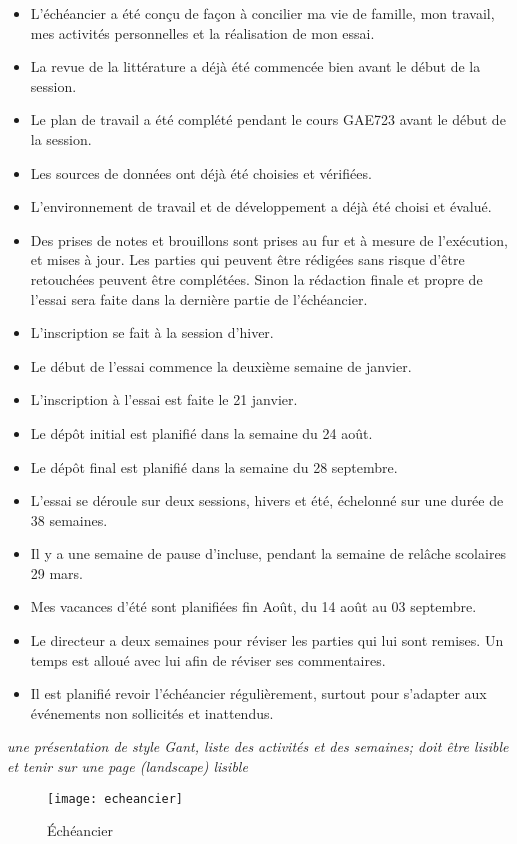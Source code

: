 \begin{itemize}
 \item L'échéancier a été conçu de façon à concilier ma vie de famille, mon travail, mes activités personnelles et la réalisation de mon essai.
 \item La revue de la littérature a déjà été commencée bien avant le début de la session.
 \item Le plan de travail a été complété pendant le cours GAE723 avant le début de la session.
 \item Les sources de données ont déjà été choisies et vérifiées.
 \item L'environnement de travail et de développement a déjà été choisi et évalué.
 \item Des prises de notes et brouillons sont prises au fur et à mesure de l'exécution, et mises à jour. Les parties qui peuvent être rédigées sans risque d'être retouchées peuvent être complétées. Sinon la rédaction finale et propre de l'essai sera faite dans la dernière partie de l'échéancier.
 \item L'inscription se fait à la session d'hiver.
 \item Le début de l'essai commence la deuxième semaine de janvier.
 \item L'inscription à l’essai est faite le 21 janvier.
 \item Le dépôt initial est planifié dans la semaine du 24 août.
 \item Le dépôt final est planifié dans la semaine du 28 septembre.
 \item L'essai se déroule sur deux sessions, hivers et été, échelonné sur une durée de 38 semaines.
 \item Il y a une semaine de pause d'incluse, pendant la semaine de relâche scolaires 29 mars. 
 \item Mes vacances d'été sont planifiées fin Août, du 14 août au 03 septembre.
 \item Le directeur a deux semaines pour réviser les parties qui lui sont remises. Un temps est alloué avec lui afin de réviser ses commentaires. 
 \item Il est planifié revoir l'échéancier régulièrement, surtout pour s'adapter aux événements non sollicités et inattendus.
\end{itemize}
\textit{une présentation de style Gant, liste des activités et des semaines; doit être lisible et tenir sur une page (landscape) lisible}
\begin{landscape}
   \begin{figure}
      \centering
      \texttt{[image: echeancier]}
      \caption{Échéancier}
      \label{fig:planning}
   \end{figure}
\end{landscape}
